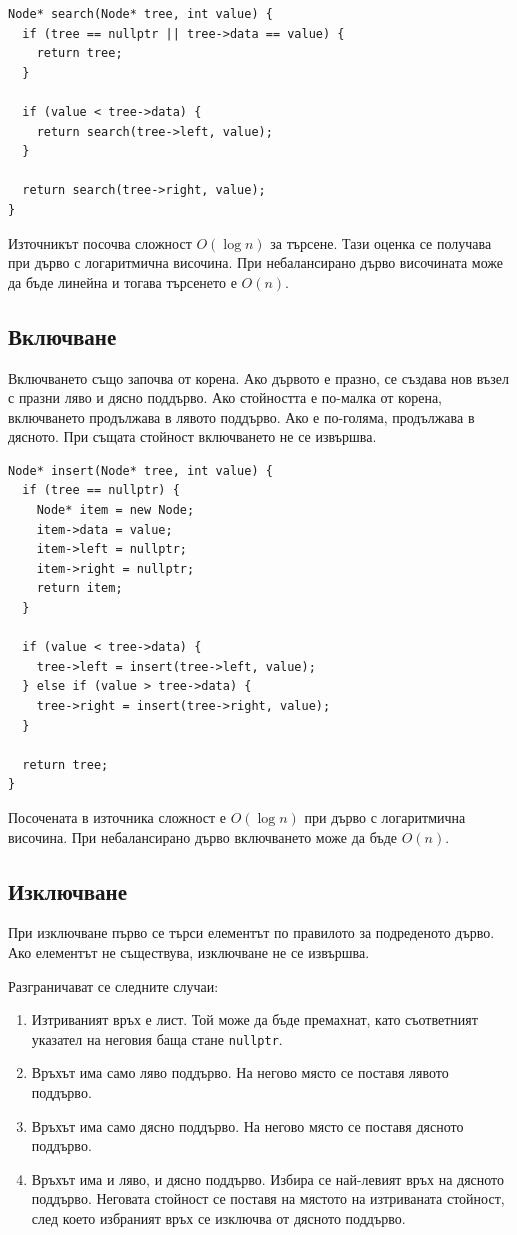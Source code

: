 \begin{verbatim}
Node* search(Node* tree, int value) {
  if (tree == nullptr || tree->data == value) {
    return tree;
  }

  if (value < tree->data) {
    return search(tree->left, value);
  }

  return search(tree->right, value);
}
\end{verbatim}

Източникът посочва сложност $O(\log n)$ за търсене. Тази оценка се получава при дърво с логаритмична височина. При небалансирано дърво височината може да бъде линейна и тогава търсенето е $O(n)$.

\subsection{Включване}\label{s:18.7.2}

Включването също започва от корена. Ако дървото е празно, се създава нов възел с празни ляво и дясно поддърво. Ако стойността е по-малка от корена, включването продължава в лявото поддърво. Ако е по-голяма, продължава в дясното. При същата стойност включването не се извършва.

\begin{verbatim}
Node* insert(Node* tree, int value) {
  if (tree == nullptr) {
    Node* item = new Node;
    item->data = value;
    item->left = nullptr;
    item->right = nullptr;
    return item;
  }

  if (value < tree->data) {
    tree->left = insert(tree->left, value);
  } else if (value > tree->data) {
    tree->right = insert(tree->right, value);
  }

  return tree;
}
\end{verbatim}

Посочената в източника сложност е $O(\log n)$ при дърво с логаритмична височина. При небалансирано дърво включването може да бъде $O(n)$.

\subsection{Изключване}\label{s:18.7.3}

При изключване първо се търси елементът по правилото за подреденото дърво. Ако елементът не съществува, изключване не се извършва.

Разграничават се следните случаи:

\begin{enumerate}
    \item Изтриваният връх е лист. Той може да бъде премахнат, като съответният указател на неговия баща стане \verb|nullptr|.
    \item Връхът има само ляво поддърво. На негово място се поставя лявото поддърво.
    \item Връхът има само дясно поддърво. На негово място се поставя дясното поддърво.
    \item Връхът има и ляво, и дясно поддърво. Избира се най-левият връх на дясното поддърво. Неговата стойност се поставя на мястото на изтриваната стойност, след което избраният връх се изключва от дясното поддърво.
\end{enumerate}

